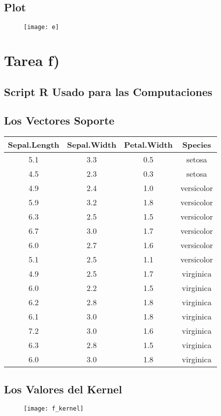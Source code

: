 \documentclass[fleqn]{llncs}
\begin{document}
\subsection{Plot}
\begin{figure}[H]
	\centering
	\texttt{[image: e]}
\end{figure}

\newpage

\section{Tarea f)}

\subsection{Script R Usado para las Computaciones}


\newpage

\subsection{Los Vectores Soporte}
\begin{tabular}{c | c | c | c}
	Sepal.Length & Sepal.Width & Petal.Width & Species \\
	\hline
	5.1 & 3.3 & 0.5 & setosa \\
	4.5 & 2.3 & 0.3 & setosa \\
	4.9 & 2.4 & 1.0 & versicolor \\
	5.9 & 3.2 & 1.8 & versicolor \\
	6.3 & 2.5 & 1.5 & versicolor \\
	6.7 & 3.0 & 1.7 & versicolor \\
	6.0 & 2.7 & 1.6 & versicolor \\
	5.1 & 2.5 & 1.1 & versicolor \\
	4.9 & 2.5 & 1.7 & virginica \\
	6.0 & 2.2 & 1.5 & virginica \\
	6.2 & 2.8 & 1.8 & virginica \\
	6.1 & 3.0 & 1.8 & virginica \\
	7.2 & 3.0 & 1.6 & virginica \\
	6.3 & 2.8 & 1.5 & virginica \\
	6.0 & 3.0 & 1.8 & virginica \\
\end{tabular}

\subsection{Los Valores del Kernel}
\begin{figure}[H]
	\centering
	\texttt{[image: f\_kernel]}
\end{figure}
\end{document}

